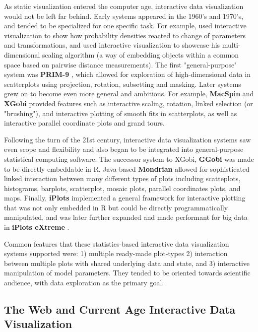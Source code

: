 \documentclass[12pt,a4paper]{article}
\begin{document}
As static visualization entered the computer age, interactive data visualization would not be left far behind. Early systems appeared in the 1960's and 1970's, and tended to be specialized for one specific task. For example, \cite{fowlkes1969} used interactive visualization to show how probability densities reacted to change of parameters and transformations, and \cite{kruskal1964} used interactive visualization to showcase his multi-dimensional scaling algorithm (a way of embedding objects within a common space based on pairwise distance measurements). The first "general-purpose" system was \textbf{PRIM-9} \citep{fisherkeller1974}, which allowed for exploration of high-dimensional data in scatterplots using projection, rotation, subsetting and masking. Later systems grew on to become even more general and ambitious. For example, \textbf{MacSpin} \citep{donoho1988} and \textbf{XGobi} \citep{swayne1998} provided features such as interactive scaling, rotation, linked selection (or "brushing"), and interactive plotting of smooth fits in scatterplots, as well as interactive parallel coordinate plots and grand tours.

Following the turn of the 21st century, interactive data visualization systems saw even scope and flexibility and also began to be integrated into general-purpose statistical computing software. The successor system to XGobi, \textbf{GGobi} \citep{swayne2003} was made to be directly embeddable in R. Java-based \textbf{Mondrian} \citep{theus2002} allowed for sophisticated linked interaction between many different types of plots including scatteplots, histograms, barplots, scatterplot, mosaic plots, parallel coordinates plots, and maps. Finally, \textbf{iPlots} \citep{urbanek2003} implemented a general framework for interactive plotting that was not only embedded in R but could be directly programmatically manipulated, and was later further expanded and made performant for big data in \textbf{iPlots eXtreme} \citep{urbanek2011}.

Common features that these statistics-based interactive data visualization systems supported were: 1) multiple ready-made plot-types 2) interaction between multiple plots with shared underlying data and state, and 3) interactive manipulation of model parameters. They tended to be oriented towards scientific audience, with data exploration as the primary goal.     

\subsection{The Web and Current Age Interactive Data Visualization}
\label{sec:currentage}
\end{document}

